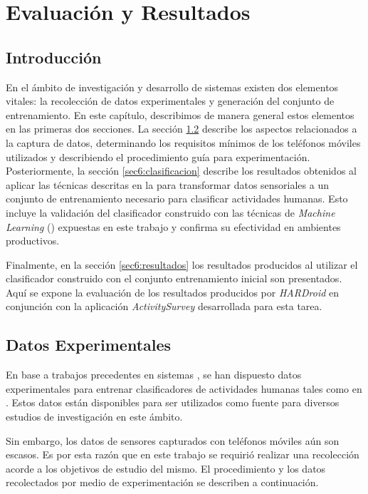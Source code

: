 
\chapter{Evaluación y Resultados}

\label{chap6:evaluacion}

\section{Introducción}

En el ámbito de investigación y desarrollo de sistemas 
existen dos elementos vitales: la recolección de datos experimentales
y generación del conjunto de entrenamiento. En este capítulo, describimos
de manera general estos elementos en las primeras dos secciones. La
sección \ref{sec6:recoleccion} describe los aspectos relacionados
a la captura de datos, determinando los requisitos mínimos de los
teléfonos móviles utilizados y describiendo el procedimiento guía
para experimentación. Posteriormente, la sección \ref{sec6:clasificacion}
describe los resultados obtenidos al aplicar las técnicas descritas
en la  para transformar datos sensoriales
a un conjunto de entrenamiento necesario para clasificar actividades
humanas. Esto incluye la validación del clasificador construido con
las técnicas de \emph{Machine Learning} () expuestas en
este trabajo y confirma su efectividad en ambientes productivos. 

Finalmente, en la sección \ref{sec6:resultados} los resultados producidos
al utilizar el clasificador construido con el conjunto entrenamiento
inicial son presentados. Aquí se expone la evaluación de los resultados
producidos por \emph{HARDroid }en conjunción con la aplicación \emph{ActivitySurvey}
desarrollada para esta tarea.

\section{Datos Experimentales}

\label{sec6:recoleccion}En base a trabajos precedentes en sistemas
, se han dispuesto datos experimentales para entrenar clasificadores
de actividades humanas tales como en \cite{ReyesOrtiz2013}. Estos
datos están disponibles para ser utilizados como fuente para diversos
estudios de investigación en este ámbito. 

Sin embargo, los datos de sensores capturados con teléfonos móviles
aún son escasos. Es por esta razón que en este trabajo se requirió
realizar una recolección acorde a los objetivos de estudio del mismo.
El procedimiento y los datos recolectados por medio de experimentación
se describen a continuación.

